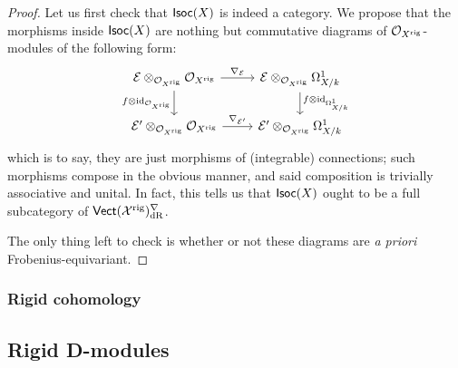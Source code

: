                 \begin{proof}
                    Let us first check that $\mathsf{Isoc}(X)$ is indeed a category. We propose that the morphisms inside $\mathsf{Isoc}(X)$ are nothing but commutative diagrams of $\mathcal{O}_{X^{\mathrm{rig}}}$-modules of the following form:
                        $$
                            \begin{tikzcd}
                            	{\E \tensor_{\calO_{X^{\rig}}} \calO_{X^{\rig}}} & {\E \tensor_{\calO_{X^{\rig}}} \Omega^1_{X/k}} \\
                            	{\E' \tensor_{\calO_{X^{\rig}}} \calO_{X^{\rig}}} & {\E' \tensor_{\calO_{X^{\rig}}} \Omega^1_{X/k}}
                            	\arrow["{f \tensor \id_{\Omega^1_{X/k}}}", from=1-2, to=2-2]
                            	\arrow["{f \tensor \id_{\calO_{X^{\rig}}}}"', from=1-1, to=2-1]
                            	\arrow["{\nabla_{\E'}}", from=2-1, to=2-2]
                            	\arrow["{\nabla_{\E}}", from=1-1, to=1-2]
                            \end{tikzcd}
                        $$
                    which is to say, they are just morphisms of (integrable) connections; such morphisms compose in the obvious manner, and said composition is trivially associative and unital. In fact, this tells us that $\mathsf{Isoc}(X)$ ought to be a full subcategory of $\mathsf{Vect}(\mathcal{X}^{\mathrm{rig}})^{\nabla}_{\mathrm{dR}}$. 
                    
                    The only thing left to check is whether or not these diagrams are \textit{a priori} Frobenius-equivariant. 
                \end{proof}
                
            \subsubsection{Rigid cohomology}
        
        \subsection{Rigid D-modules}